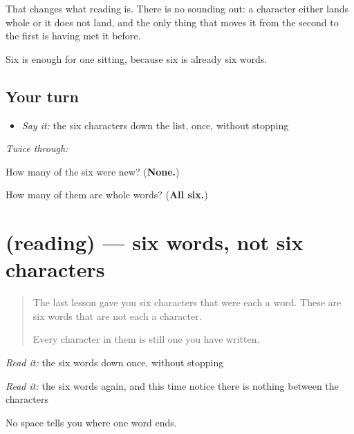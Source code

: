 That changes what reading is. There is no sounding out: a character either lands whole or it does not land, and the only thing that moves it from the second to the first is having met it before.

Six is enough for one sitting, because six is already six words.

\subsection*{Your turn}
\begin{itemize}
\raggedright
  \item \emph{Say it:} the six characters down the list, once, without stopping
\end{itemize}

\emph{Twice through:}

\begin{tcolorbox}[breakable,colback=teal!4,colframe=teal!35!black,title={Before you move on}]
How many of the six were new? (\textbf{None.})

How many of them are whole words? (\textbf{All six.})
\end{tcolorbox}
\section[(reading)]{(reading) — six words, not six characters}

\label{lesson:ZH-C29-words}



\begin{quote}
The last lesson gave you six characters that were each a word. These are six words that are not each a character.

Every character in them is still one you have written.
\end{quote}

\begin{tcolorbox}[breakable,skin=enhanced,colback=orange!6,colframe=orange!45!black,boxrule=0.5pt,arc=1mm,left=6pt,right=6pt,top=4pt,bottom=4pt,fonttitle=\bfseries,title={Read this}]
\begin{quote}
     
\end{quote}

\emph{Read it:} the six words down once, without stopping

\emph{Read it:} the six words again, and this time notice there is nothing between the characters

No space tells you where one word ends.
\end{tcolorbox}

